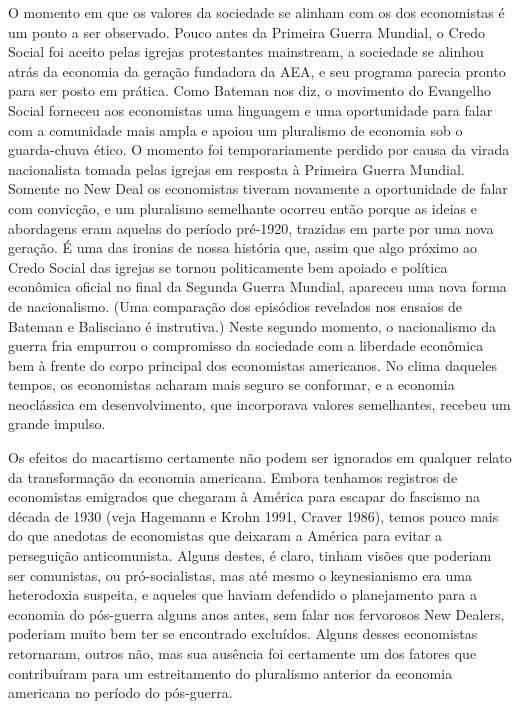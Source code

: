 \documentclass[12pt]{article}
\begin{document}
O momento em que os valores da sociedade se alinham com os dos economistas é um ponto a ser observado. Pouco antes da Primeira Guerra Mundial, o Credo Social foi aceito pelas igrejas protestantes mainstream, a sociedade se alinhou atrás da economia da geração fundadora da AEA, e seu programa parecia pronto para ser posto em prática. Como Bateman nos diz, o movimento do Evangelho Social forneceu aos economistas uma linguagem e uma oportunidade para falar com a comunidade mais ampla e apoiou um pluralismo de economia sob o guarda-chuva ético. O momento foi temporariamente perdido por causa da virada nacionalista tomada pelas igrejas em resposta à Primeira Guerra Mundial. Somente no New Deal os economistas tiveram novamente a oportunidade de falar com convicção, e um pluralismo semelhante ocorreu então porque as ideias e abordagens eram aquelas do período pré-1920, trazidas em parte por uma nova geração. É uma das ironias de nossa história que, assim que algo próximo ao Credo Social das igrejas se tornou politicamente bem apoiado e política econômica oficial no final da Segunda Guerra Mundial, apareceu uma nova forma de nacionalismo. (Uma comparação dos episódios revelados nos ensaios de Bateman e Balisciano é instrutiva.) Neste segundo momento, o nacionalismo da guerra fria empurrou o compromisso da sociedade com a liberdade econômica bem à frente do corpo principal dos economistas americanos. No clima daqueles tempos, os economistas acharam mais seguro se conformar, e a economia neoclássica em desenvolvimento, que incorporava valores semelhantes, recebeu um grande impulso.

Os efeitos do macartismo certamente não podem ser ignorados em qualquer relato da transformação da economia americana. Embora tenhamos registros de economistas emigrados que chegaram à América para escapar do fascismo na década de 1930 (veja Hagemann e Krohn 1991, Craver 1986), temos pouco mais do que anedotas de economistas que deixaram a América para evitar a perseguição anticomunista. Alguns destes, é claro, tinham visões que poderiam ser comunistas, ou pró-socialistas, mas até mesmo o keynesianismo era uma heterodoxia suspeita, e aqueles que haviam defendido o planejamento para a economia do pós-guerra alguns anos antes, sem falar nos fervorosos New Dealers, poderiam muito bem ter se encontrado excluídos. Alguns desses economistas retornaram, outros não, mas sua ausência foi certamente um dos fatores que contribuíram para um estreitamento do pluralismo anterior da economia americana no período do pós-guerra.
\end{document}
